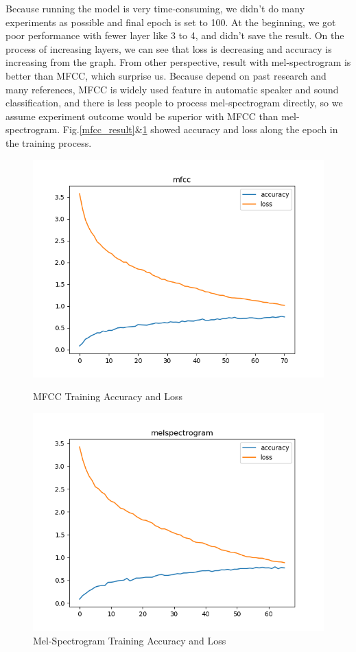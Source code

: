 Because running the model is very time-consuming, we didn't do many experiments as possible and final epoch is set to 100. At the beginning,
we got poor performance with fewer layer like 3 to 4, and didn't save the result. On the process of increasing layers,
we can see that loss is decreasing and accuracy is increasing from the graph. From other perspective, result with mel-spectrogram is 
better than MFCC, which surprise us. Because depend on past research and many references, MFCC is widely used feature in automatic speaker and sound
classification, and there is less people to process mel-spectrogram directly, so we assume experiment outcome would be superior with MFCC than mel-spectrogram. Fig.\ref{mfcc_result}\&\ref{sp_result} showed accuracy and loss along the epoch in the training process.
\begin{figure}[H]
\begin{minipage}[t]{0.5\textwidth}
\centering
\includegraphics[width=\textwidth]{./graph/mfcc.png} 
\caption{MFCC Training Accuracy and Loss}
\label{mfcc_result}
\end{minipage}
\begin{minipage}[t]{0.5\textwidth}
\centering
\includegraphics[width=\textwidth]{./graph/melspectogram_result.png} 
\caption{Mel-Spectrogram Training Accuracy and Loss}
\label{sp_result}
\end{minipage}
\end{figure}